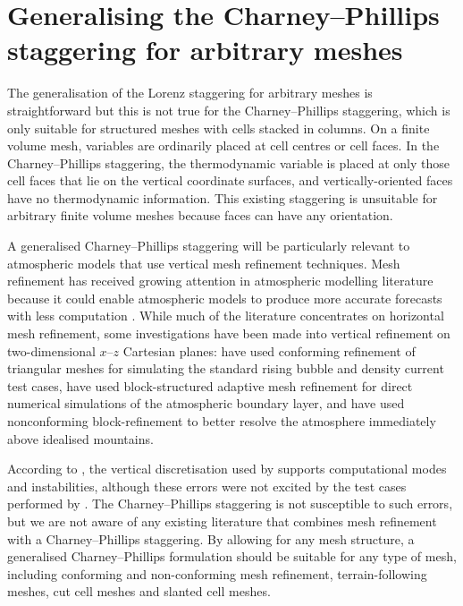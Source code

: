 \section{Generalising the Charney–Phillips staggering for arbitrary meshes}
\label{sec:cp:method}

The generalisation of the Lorenz staggering for arbitrary meshes is straightforward \citep{weller-shahrokhi2014} but this is not true for the Charney--Phillips staggering, which is only suitable for structured meshes with cells stacked in columns.
On a finite volume mesh, variables are ordinarily placed at cell centres or cell faces.
In the Charney--Phillips staggering, the thermodynamic variable is placed at only those cell faces that lie on the vertical coordinate surfaces, and vertically-oriented faces have no thermodynamic information.
This existing staggering is unsuitable for arbitrary finite volume meshes because faces can have any orientation.

A generalised Charney--Phillips staggering will be particularly relevant to atmospheric models that use vertical mesh refinement techniques.
Mesh refinement has received growing attention in atmospheric modelling literature because it could enable atmospheric models to produce more accurate forecasts with less computation \citep{behrens2006,jablonowski2009}.
While much of the literature concentrates on horizontal mesh refinement, some investigations have been made into vertical refinement on two-dimensional $x$--$z$ Cartesian planes:
\citet{mueller2013} have used conforming refinement of triangular meshes for simulating the standard rising bubble and density current test cases, \citet{vanhooft2018} have used block-structured adaptive mesh refinement for direct numerical simulations of the atmospheric boundary layer, and \citet{yamazaki-satomura2012} have used nonconforming block-refinement to better resolve the atmosphere immediately above idealised mountains.

According to \citet{thuburn-woolings2005}, the vertical discretisation used by \citet{yamazaki-satomura2012} supports computational modes and instabilities, although these errors were not excited by the test cases performed by \citet{yamazaki-satomura2012}.
The Charney--Phillips staggering is not susceptible to such errors, but we are not aware of any existing literature that combines mesh refinement with a Charney--Phillips staggering.
By allowing for any mesh structure, a generalised Charney--Phillips formulation should be suitable for any type of mesh, including conforming and non-conforming mesh refinement, terrain-following meshes, cut cell meshes and slanted cell meshes.

